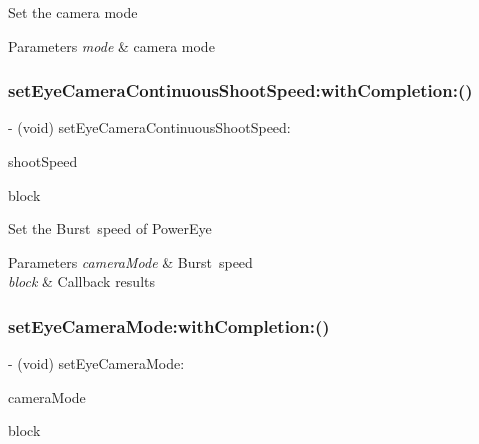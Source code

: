 Set the camera mode


\begin{DoxyParams}{Parameters}
{\em mode} & camera mode \\
\hline
\end{DoxyParams}
\mbox{\label{interface_p_v_camera_a48df0e917a7f559200c6855cd95857aa}} 
\subsubsection{\texorpdfstring{set\+Eye\+Camera\+Continuous\+Shoot\+Speed\+:with\+Completion\+:()}{setEyeCameraContinuousShootSpeed:withCompletion:()}}
{\footnotesize\ttfamily -\/ (void) set\+Eye\+Camera\+Continuous\+Shoot\+Speed\+: \begin{DoxyParamCaption}\item[{(P\+V\+Eye\+Camera\+Continuous\+Shoot\+Speed)}]{shoot\+Speed }\item[{withCompletion:(P\+V\+Completion\+Block)}]{block }\end{DoxyParamCaption}}

Set the Burst speed of Power\+Eye


\begin{DoxyParams}{Parameters}
{\em camera\+Mode} & Burst speed \\
\hline
{\em block} & Callback results \\
\hline
\end{DoxyParams}
\mbox{\label{interface_p_v_camera_a6825cd775ec04a27772a7f7c559d6dce}} 
\subsubsection{\texorpdfstring{set\+Eye\+Camera\+Mode\+:with\+Completion\+:()}{setEyeCameraMode:withCompletion:()}}
{\footnotesize\ttfamily -\/ (void) set\+Eye\+Camera\+Mode\+: \begin{DoxyParamCaption}\item[{(P\+V\+Eye\+Camera\+Mode)}]{camera\+Mode }\item[{withCompletion:(P\+V\+Completion\+Block)}]{block }\end{DoxyParamCaption}}

